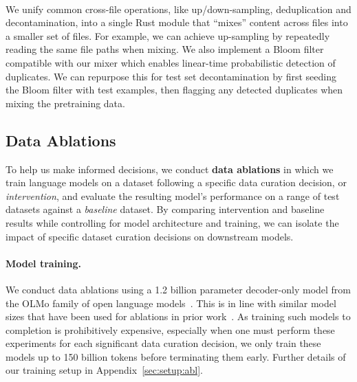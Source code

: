 \paragraph{\toolkitDedupeText} We unify common cross-file operations, like up/down-sampling, deduplication and decontamination, into a single Rust module that ``mixes'' content across files into a smaller set of files.
For example, we can achieve up-sampling by repeatedly reading the same file paths when mixing.
We also implement a Bloom filter~\citep{Bloom1970} compatible with our mixer which enables linear-time probabilistic detection of duplicates.
We can repurpose this for test set decontamination by first seeding the Bloom filter with test examples, then flagging any detected duplicates when mixing the pretraining data.











\subsection{Data Ablations}
\label{sec:experimental-methodology}



To help us make informed decisions, we conduct \textbf{data ablations} 
in which we train language models on a dataset following a specific data curation decision, or \emph{intervention}, and evaluate the resulting model's performance on a range of test datasets against a \emph{baseline} dataset.
By comparing intervention and baseline results while controlling for model architecture and training, we can isolate the impact of specific dataset curation decisions on downstream models.

\paragraph{Model training.}
We conduct data ablations using a 1.2 billion parameter decoder-only model from the OLMo family of open language models~\citep{olmo20247b}.
This is in line with similar model sizes that have been used for ablations in prior work~\citep{le-scao-etal-2022-language}.
As training such models to completion is prohibitively expensive, especially when one must perform these experiments for each significant data curation decision, we only train these models up to 150 billion tokens before terminating them early.
Further details of our training setup in Appendix~\ref{sec:setup:abl}.



